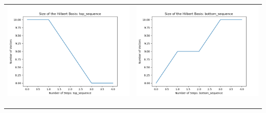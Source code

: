 \documentclass[10pt]{article}
\begin{document}
\begin{tabular}{c|c}
\begin{minipage}{.4\textwidth}
\includegraphics[width=\textwidth]{"DATA/4d/5 generators 2 bound B/top_sequence SIZE"}
\end{minipage} &
\begin{minipage}{.4\textwidth}
\includegraphics[width=\textwidth]{"DATA/4d/5 generators 2 bound B bottomup/bottom_sequence SIZE"}
\end{minipage} \\ \\
\hline \\\begin{minipage}{.4\textwidth}

\end{minipage}
\end{tabular}
\end{document}
